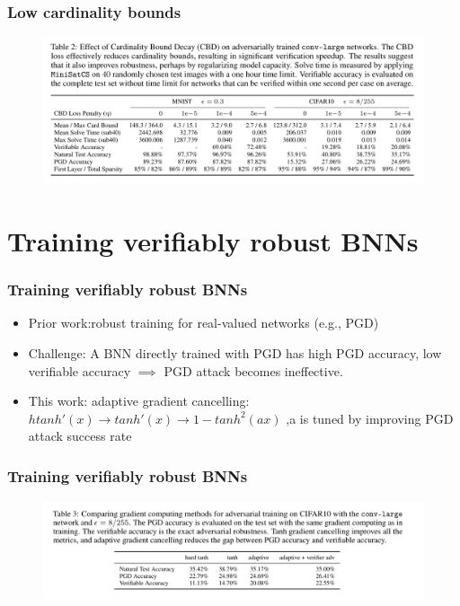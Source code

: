 \documentclass[aspectratio=169%
,serif,mathserif]{beamer}
\begin{document}
\begin{frame}
	\frametitle{Low cardinality bounds}
	\begin{figure}
		\includegraphics[width=0.9\linewidth]{5.png}
	\end{figure}
\end{frame}

\section{Training verifiably robust BNNs}

\begin{frame}
	\frametitle{Training verifiably robust BNNs}
	\begin{itemize}
		\item Prior work:robust training for real-valued networks (e.g., PGD)
		\item Challenge: A BNN directly trained with PGD has high PGD accuracy, low verifiable accuracy $\implies$ PGD attack becomes ineffective.
		\item This work: adaptive gradient cancelling: $htanh'(x) \to tanh'(x) \to 1- tanh^2(ax)$ ,a is tuned by improving PGD attack success rate
	\end{itemize}
\end{frame}

\begin{frame}
	\frametitle{Training verifiably robust BNNs}
	\begin{figure}
		\includegraphics[width=1\linewidth]{6.png}
	\end{figure}
\end{frame}
\end{document}
